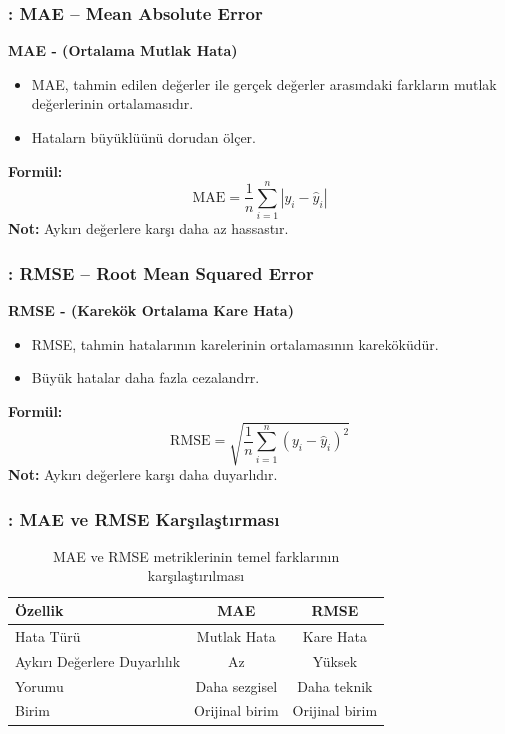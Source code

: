 \documentclass[12pt]{beamer}
\begin{document}
	
	\begin{frame}
		\frametitle{\insertsection:  MAE – Mean Absolute Error}
		\textbf{MAE - (Ortalama Mutlak Hata)}
		\begin{itemize}
			\item MAE, tahmin edilen değerler ile gerçek değerler
			arasındaki farkların mutlak değerlerinin ortalamasıdır.
			\item Hatalarn büyüklüünü dorudan ölçer.
		\end{itemize}
		\vspace{0.5cm}
		\textbf{Formül:}
		\[
		\text{MAE} = \frac{1}{n} \sum_{i=1}^{n} \left| y_i - \hat{y}_i \right|
		\]
		\vspace{0.3cm}
		\textbf{Not:} Aykırı değerlere karşı daha az hassastır.
	\end{frame}
	
	\begin{frame}
		\frametitle{\insertsection: RMSE – Root Mean Squared Error}
		\textbf{RMSE - (Karekök Ortalama Kare Hata)}
		\begin{itemize}
			\item RMSE, tahmin hatalarının karelerinin ortalamasının
			kareköküdür.
			\item Büyük hatalar daha fazla cezalandrr.
		\end{itemize}
		\vspace{0.5cm}
		\textbf{Formül:}
		\[
		\text{RMSE} = \sqrt{ \frac{1}{n} \sum_{i=1}^{n} \left( y_i - \hat{y}_i
			\right)^2 }
		\]
		\vspace{0.3cm}
		\textbf{Not:} Aykırı değerlere karşı daha duyarlıdır.
	\end{frame}
	
	\begin{frame}
		\frametitle{\insertsection: MAE ve RMSE Karşılaştırması}
		\begin{table}
			\centering
			\small
			\begin{tabular}{l c c}
				\toprule
				\textbf{Özellik}            & \textbf{MAE}   & \textbf{RMSE} \\
				\midrule
				Hata Türü                   & Mutlak Hata    & Kare
				Hata                                                         \\
				Aykırı Değerlere Duyarlılık & Az             & Yüksek
				\\
				Yorumu                      & Daha sezgisel  & Daha
				teknik                                                       \\
				Birim                       & Orijinal birim &
				Orijinal birim                                               \\
				\bottomrule
			\end{tabular}
			\caption{\small MAE ve RMSE metriklerinin temel farklarının
				karşılaştırılması}
		\end{table}
	\end{frame}
	
\end{document}

